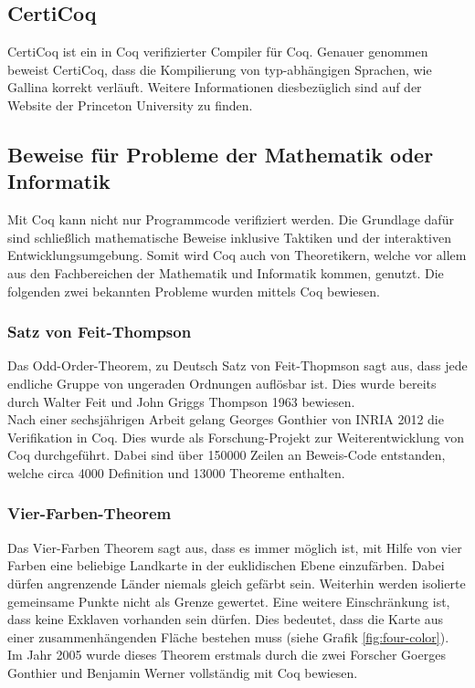 \subsection{CertiCoq}
CertiCoq ist ein in Coq verifizierter Compiler für Coq. Genauer genommen beweist CertiCoq, dass die Kompilierung von typ-abhängigen Sprachen, wie Gallina korrekt verläuft.\cite{CERTICOQ01:FV}\cite{CERTICOQ02:FV} Weitere Informationen diesbezüglich sind auf der Website der Princeton University zu finden.

\subsection{Beweise für Probleme der Mathematik oder Informatik}
Mit Coq kann nicht nur Programmcode verifiziert werden. Die Grundlage dafür sind schließlich mathematische Beweise inklusive Taktiken und der interaktiven Entwicklungsumgebung. Somit wird Coq auch von Theoretikern, welche vor allem aus den Fachbereichen der Mathematik und Informatik kommen, genutzt. Die folgenden zwei bekannten Probleme wurden mittels Coq bewiesen. 

\subsubsection{Satz von Feit-Thompson}
Das Odd-Order-Theorem, zu Deutsch Satz von Feit-Thopmson sagt aus, dass jede endliche Gruppe von ungeraden Ordnungen auflösbar ist. Dies wurde bereits durch Walter Feit und John Griggs Thompson 1963 bewiesen.\\
Nach einer sechsjährigen Arbeit gelang Georges Gonthier von INRIA 2012 die Verifikation in Coq. Dies wurde als Forschung-Projekt zur Weiterentwicklung von Coq durchgeführt. Dabei sind über 150000 Zeilen an Beweis-Code entstanden, welche circa 4000 Definition und 13000 Theoreme enthalten.\cite{ODD01:FV}

\subsubsection{Vier-Farben-Theorem}
Das Vier-Farben Theorem sagt aus, dass es immer möglich ist, mit Hilfe von vier Farben eine beliebige Landkarte in der euklidischen Ebene einzufärben. Dabei dürfen angrenzende Länder niemals gleich gefärbt sein. Weiterhin werden isolierte gemeinsame Punkte nicht als Grenze gewertet. Eine weitere Einschränkung ist, dass keine Exklaven vorhanden sein dürfen. Dies bedeutet, dass die Karte aus einer zusammenhängenden Fläche bestehen muss (siehe Grafik \ref{fig:four-color}).\cite{FOURCOLORS01:FV}\\
Im Jahr 2005 wurde dieses Theorem erstmals durch die zwei Forscher Goerges Gonthier und Benjamin Werner vollständig mit Coq bewiesen.
\cite{FOURCOLORS02:FV}\\

